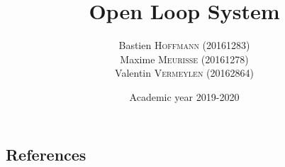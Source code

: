 \documentclass[a4paper, 12pt]{article}
\title{Open Loop System}
\author{
    Bastien \textsc{Hoffmann} (20161283)\\
    Maxime \textsc{Meurisse} (20161278)\\
    Valentin \textsc{Vermeylen} (20162864)\\
}
\date{Academic year 2019-2020}
\begin{document}
    
    
    
    
    
    
    
    
    
    
    
    
    \newpage
    \subsection{References}
    \nocite{*}
    \printbibliography
\end{document}
